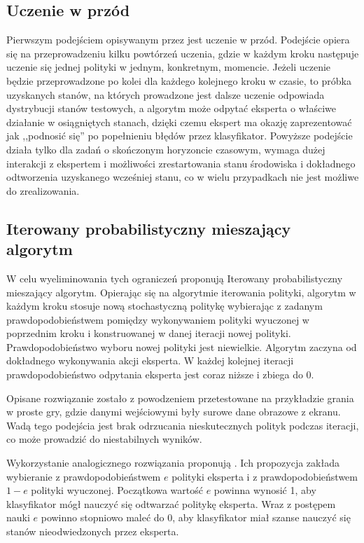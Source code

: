 \subsection{Uczenie w przód}
Pierwszym podejściem opisywanym przez \cite{DBLP:journals/corr/abs-1011-0686} jest uczenie w przód. Podejście opiera się na przeprowadzeniu kilku powtórzeń uczenia, gdzie w każdym kroku następuje uczenie się jednej polityki w jednym, konkretnym, momencie. Jeżeli uczenie będzie przeprowadzone po kolei dla każdego kolejnego kroku w czasie, to próbka uzyskanych stanów, na których prowadzone jest dalsze uczenie odpowiada dystrybucji stanów testowych, a algorytm może odpytać eksperta o właściwe działanie w osiągniętych stanach, dzięki czemu ekspert ma okazję zaprezentować jak ,,podnosić się'' po popełnieniu błędów przez klasyfikator. Powyższe podejście działa tylko dla zadań o skończonym horyzoncie czasowym, wymaga dużej interakcji z ekspertem i możliwości zrestartowania stanu środowiska i dokładnego odtworzenia uzyskanego wcześniej stanu, co w wielu przypadkach nie jest możliwe do zrealizowania.

\subsection{Iterowany probabilistyczny mieszający algorytm}\label{smile}
W celu wyeliminowania tych ograniczeń \cite{DBLP:journals/corr/abs-1011-0686} proponują Iterowany probabilistyczny mieszający algorytm. Opierając się na algorytmie iterowania polityki, algorytm w każdym kroku stosuje nową stochastyczną politykę wybierając z zadanym prawdopodobieństwem pomiędzy wykonywaniem polityki wyuczonej w poprzednim kroku i konstruowanej w danej iteracji nowej polityki. Prawdopodobieństwo wyboru nowej polityki jest niewielkie. Algorytm zaczyna od dokładnego wykonywania akcji eksperta. W każdej kolejnej iteracji prawdopodobieństwo odpytania eksperta jest coraz niższe i zbiega do 0.

Opisane rozwiązanie zostało z powodzeniem przetestowane na przykładzie grania w proste gry, gdzie danymi wejściowymi były surowe dane obrazowe z ekranu. Wadą tego podejścia jest brak odrzucania nieskutecznych polityk podczas iteracji, co może prowadzić do niestabilnych wyników.

Wykorzystanie analogicznego rozwiązania proponują \cite{DBLP:journals/corr/BengioVJS15}. Ich propozycja zakłada wybieranie z prawdopodobieństwem $e$ polityki eksperta i z prawdopodobieństwem $1-e$ polityki wyuczonej. Początkowa wartość $e$ powinna wynosić 1, aby klasyfikator mógł nauczyć się  odtwarzać politykę eksperta. Wraz z postępem nauki $e$ powinno stopniowo maleć do 0, aby klasyfikator miał szanse nauczyć się stanów nieodwiedzonych przez eksperta.
